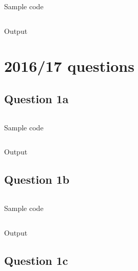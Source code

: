 \documentclass[a4paper]{article}
\begin{document}
\begin{listing}[h!]
  \inputminted[linenos,frame=lines]{cpp}{listings/csc8501_pp1314_q3.cpp}
  \caption{Sample code}
  \label{listing:csc8501_pp1314_q3}
\end{listing}
\FloatBarrier

\begin{listing}[h!]
  \inputminted[linenos,frame=lines]{text}{out/csc8501_pp1314_q3.txt}
  \caption{Output}
  \label{listing:csc8501_pp1314_q3_o}
\end{listing}
\FloatBarrier

\section{2016/17 questions}

\subsection{Question 1a}

\begin{listing}[h!]
  \inputminted[linenos,frame=lines]{cpp}{listings/csc8501_1617_q1_a.cpp}
  \caption{Sample code}
  \label{listing:csc8501_1617_q1a}
\end{listing}
\FloatBarrier

\begin{listing}[h!]
  \inputminted[linenos,frame=lines]{text}{out/csc8501_1617_q1_a.txt}
  \caption{Output}
  \label{listing:csc8501_1617_q1a_o}
\end{listing}
\FloatBarrier

\clearpage

\subsection{Question 1b}

\begin{listing}[h!]
  \inputminted[linenos,frame=lines]{cpp}{listings/csc8501_1617_q1_b.cpp}
  \caption{Sample code}
  \label{listing:csc8501_1617_q1b}
\end{listing}
\FloatBarrier

\begin{listing}[h!]
  \inputminted[linenos,frame=lines]{text}{out/csc8501_1617_q1_b.txt}
  \caption{Output}
  \label{listing:csc8501_1617_q1b_o}
\end{listing}
\FloatBarrier

\clearpage

\subsection{Question 1c}
\end{document}
